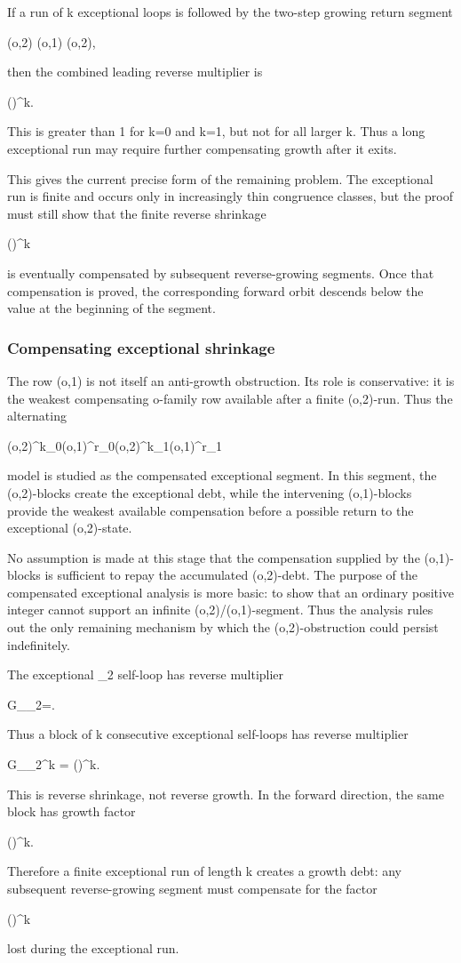 \documentclass[11pt,letterpaper]{amsart}
\def\({}%
\def\){}%
\def\[{ }%
\def\]{ }%
\theoremstyle{definition}
\theoremstyle{plain}
\theoremstyle{plain}
\theoremstyle{remark}
\begin{document}
If a run of \(k\) exceptional loops is followed by the two-step growing
return segment
\[
(o,2)
(o,1)
(o,2),
\]
then the combined leading reverse multiplier is
\[
\left(\right)^k\cdot {}.
\]
This is greater than \(1\) for \(k=0\) and \(k=1\), but not for all
larger \(k\).  Thus a long exceptional run may require further
compensating growth after it exits.

This gives the current precise form of the remaining problem.  The
exceptional run is finite and occurs only in increasingly thin
congruence classes, but the proof must still show that the finite
reverse shrinkage
\[
\left(\right)^k
\]
is eventually compensated by subsequent reverse-growing segments.
Once that compensation is proved, the corresponding forward orbit
descends below the value at the beginning of the segment.

\subsubsection{Compensating exceptional shrinkage}
\label{subsubsec:compensating-exceptional-shrinkage}

The row \((o,1)\) is not itself an anti-growth obstruction.  Its role is
conservative: it is the weakest compensating \(o\)-family row available
after a finite \((o,2)\)-run.  Thus the alternating
\[
(o,2)^{k_0}(o,1)^{r_0}(o,2)^{k_1}(o,1)^{r_1}\cdots
\]
model is studied as the compensated exceptional segment.  In this segment,
the \((o,2)\)-blocks create the exceptional debt, while the intervening
\((o,1)\)-blocks provide the weakest available compensation before a
possible return to the exceptional \((o,2)\)-state.

No assumption is made at this stage that the compensation supplied by the
\((o,1)\)-blocks is sufficient to repay the accumulated \((o,2)\)-debt.
The purpose of the compensated exceptional analysis is more basic: to show
that an ordinary positive integer cannot support an infinite
\((o,2)/(o,1)\)-segment.  Thus the analysis rules out the only remaining
mechanism by which the \((o,2)\)-obstruction could persist indefinitely.

The exceptional \(\Omega_2\) self-loop has reverse multiplier
\[
G_{\Omega_2}=.
\]
Thus a block of \(k\) consecutive exceptional self-loops has reverse
multiplier
\[
G_{\Omega_2^k}
=
\left(\right)^k.
\]
This is reverse shrinkage, not reverse growth.  In the forward direction,
the same block has growth factor
\[
\left(\right)^k.
\]
Therefore a finite exceptional run of length \(k\) creates a growth debt:
any subsequent reverse-growing segment must compensate for the factor
\[
\left(\right)^k
\]
lost during the exceptional run.
\end{document}
